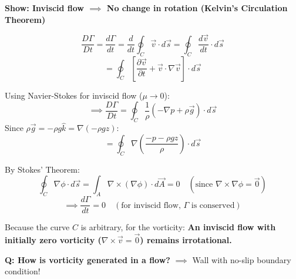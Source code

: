 \textbf{Show: Inviscid flow $\implies$ No change in rotation (Kelvin's Circulation Theorem)}

$$ \frac{D\Gamma}{Dt} = \frac{d\Gamma}{dt} = \frac{d}{dt} \oint_C \vec{v} \cdot d\vec{s} = \oint_C \frac{d\vec{v}}{dt} \cdot d\vec{s} $$
$$ = \oint_C \left[ \frac{\partial \vec{v}}{\partial t} + \vec{v} \cdot \nabla \vec{v} \right] \cdot d\vec{s} $$

Using Navier-Stokes for inviscid flow ($\mu \to 0$):
$$ \implies \frac{D\Gamma}{Dt} = \oint_C \frac{1}{\rho} (-\nabla p + \rho \vec{g}) \cdot d\vec{s} $$
Since $\rho \vec{g} = -\rho g \hat{k} = \nabla(-\rho g z)$:
$$ = \oint_C \nabla \left( \frac{-p - \rho g z}{\rho} \right) \cdot d\vec{s} $$

By Stokes' Theorem:
$$ \oint_C \nabla \phi \cdot d\vec{s} = \int_A \nabla \times (\nabla \phi) \cdot d\vec{A} = 0 \quad (\text{since } \nabla \times \nabla \phi = \vec{0}) $$
$$ \implies \frac{d\Gamma}{dt} = 0 \quad (\text{for inviscid flow, } \Gamma \text{ is conserved}) $$

Because the curve $C$ is arbitrary, for the vorticity:
\textbf{An inviscid flow with initially zero vorticity ($\nabla \times \vec{v} = \vec{0}$) remains irrotational.}

\textbf{Q: How is vorticity generated in a flow?}
$\implies$ Wall with no-slip boundary condition!

\begin{center}
\end{center}